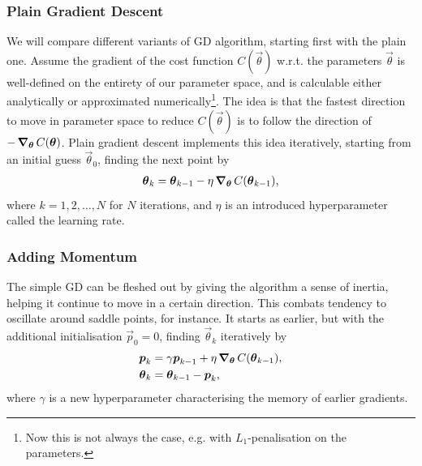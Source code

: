     \subsubsection{Plain Gradient Descent}
        We will compare different variants of GD algorithm, starting first with the plain one. Assume the gradient of the cost function $C(\vec{\theta})$ w.r.t. the parameters $\vec{\theta}$ is well-defined on the entirety of our parameter space, and is calculable either analytically or approximated numerically\footnote{Now this is not always the case, e.g. with $L_1$-penalisation on the parameters.}. The idea is that the fastest direction to move in parameter space to reduce $C(\vec{\theta})$ is to follow the direction of $-\operatorname{\operatorname{\boldsymbol{\nabla}}_{\boldsymbol{\theta}}} C(\boldsymbol{\theta})$. Plain gradient descent implements this idea iteratively, starting from an initial guess $\vec{\theta}_0$, finding the next point by
        \begin{align*}
            \boldsymbol{\theta}_{k} = \boldsymbol{\theta}_{k-1} - \eta \operatorname{\operatorname{\boldsymbol{\nabla}}_{\boldsymbol{\theta}}} C(\boldsymbol{\theta}_{k-1}),
        \end{align*}
        where $k=1,2,\ldots,N$ for $N$ iterations, and $\eta$ is an introduced hyperparameter called the learning rate.

    \subsubsection{Adding Momentum}
        The simple GD can be fleshed out by giving the algorithm a sense of inertia, helping it continue to move in a certain direction. This combats tendency to oscillate around saddle points, for instance. It starts as earlier, but with the additional initialisation $\vec{p}_0 = 0$, finding $\vec{\theta}_k$ iteratively by 
        \begin{subequations}
            \begin{align*}
                \boldsymbol{p}_{k} &= \gamma \boldsymbol{p}_{k-1} + \eta \operatorname{\operatorname{\boldsymbol{\nabla}}_{\boldsymbol{\theta}}} C(\boldsymbol{\theta}_{k-1}), \\
                \boldsymbol{\theta}_k &= \boldsymbol{\theta}_{k-1} - \boldsymbol{p}_k,
            \end{align*}
        \end{subequations}
        where $\gamma$ is a new hyperparameter characterising the memory of earlier gradients.


